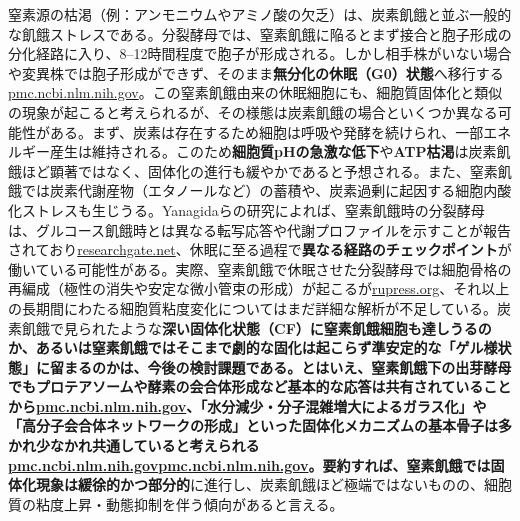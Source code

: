  窒素源の枯渇（例：アンモニウムやアミノ酸の欠乏）は、炭素飢餓と並ぶ一般的な飢餓ストレスである。分裂酵母では、窒素飢餓に陥るとまず接合と胞子形成の分化経路に入り、8–12時間程度で胞子が形成される。しかし相手株がいない場合や変異株では胞子形成ができず、そのまま\textbf{無分化の休眠（G0）状態}へ移行する\href{https://pmc.ncbi.nlm.nih.gov/articles/PMC6857596/\#:~:text=When\%20nutrients\%20become\%20growth\%20limiting,yeast\%20cells\%20that\%20have\%20slowly}{pmc.ncbi.nlm.nih.gov}。この窒素飢餓由来の休眠細胞にも、細胞質固体化と類似の現象が起こると考えられるが、その様態は炭素飢餓の場合といくつか異なる可能性がある。まず、炭素は存在するため細胞は呼吸や発酵を続けられ、一部エネルギー産生は維持される。このため\textbf{細胞質pHの急激な低下}や\textbf{ATP枯渇}は炭素飢餓ほど顕著ではなく、固体化の進行も緩やかであると予想される。また、窒素飢餓では炭素代謝産物（エタノールなど）の蓄積や、炭素過剰に起因する細胞内酸化ストレスも生じうる。Yanagidaらの研究によれば、窒素飢餓時の分裂酵母は、グルコース飢餓時とは異なる転写応答や代謝プロファイルを示すことが報告されており\href{https://www.researchgate.net/publication/262226866_Does_a_shift_to_limited_glucose_activate_checkpoint_control_in_fission_yeast\#:~:text=,1995\%2C\%20Takeda\%20et}{researchgate.net}、休眠に至る過程で\textbf{異なる経路のチェックポイント}が働いている可能性がある。実際、窒素飢餓で休眠させた分裂酵母では細胞骨格の再編成（極性の消失や安定な微小管束の形成）が起こるが\href{https://rupress.org/jcb/article/210/1/99/38063/A-stable-microtubule-array-drives-fission-yeast\#:~:text=The\%20fission\%20yeast\%20cytoskeleton\%20is,is\%20drastically\%20reshaped\%20as}{rupress.org}、それ以上の長期間にわたる細胞質粘度変化についてはまだ詳細な解析が不足している。炭素飢餓で見られたような\textbf{深い固体化状態（CF）\textbf{に窒素飢餓細胞も達しうるのか、あるいは窒素飢餓ではそこまで劇的な固化は起こらず準安定的な「ゲル様状態」に留まるのかは、今後の検討課題である。とはいえ、窒素飢餓下の出芽酵母でもプロテアソームや酵素の会合体形成など基本的な応答は共有されていることから\href{https://pmc.ncbi.nlm.nih.gov/articles/PMC6857596/\#:~:text=shown\%20to\%20introduce\%20structural\%20changes,2016}{pmc.ncbi.nlm.nih.gov}、}「水分減少・分子混雑増大によるガラス化」\textbf{や}「高分子会合体ネットワークの形成」\textbf{といった固体化メカニズムの基本骨子は多かれ少なかれ共通していると考えられる\href{https://pmc.ncbi.nlm.nih.gov/articles/PMC6857596/\#:~:text=organisation,high\%20amounts\%20of\%20carbohydrates\%2C\%20possibly}{pmc.ncbi.nlm.nih.gov}\href{https://pmc.ncbi.nlm.nih.gov/articles/PMC6857596/\#:~:text=shown\%20to\%20introduce\%20structural\%20changes,2016}{pmc.ncbi.nlm.nih.gov}。要約すれば、窒素飢餓では}固体化現象は緩徐的かつ部分的}に進行し、炭素飢餓ほど極端ではないものの、細胞質の粘度上昇・動態抑制を伴う傾向があると言える。

